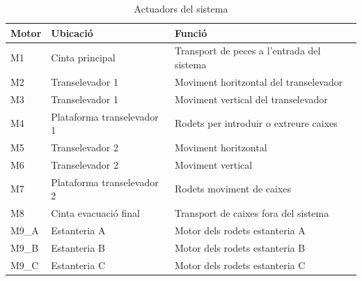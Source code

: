 \documentclass[a4paper,11pt,DIV=13,headings=normal,abstract=true,twoside=semi]{article}
\begin{document}
\begin{table}[H]
\centering
\small

\caption{Actuadors del sistema}
\label{tab:tab_actuadors}
\begin{tabular}{|p{3cm}|p{5cm}|p{6cm}|}

\hline
\textbf{Motor} & \textbf{Ubicació} & \textbf{Funció} \\ \hline

M1 & Cinta principal & Transport de peces a l'entrada del sistema \\ \hline
M2 & Transelevador 1 & Moviment horitzontal del transelevador \\ \hline
M3 & Transelevador 1 & Moviment vertical del transelevador \\ \hline
M4 & Plataforma transelevador 1 & Rodets per introduir o extreure caixes \\ \hline
M5 & Transelevador 2 & Moviment horitzontal \\ \hline
M6 & Transelevador 2 & Moviment vertical \\ \hline
M7 & Plataforma transelevador 2 & Rodets moviment de caixes \\ \hline
M8 & Cinta evacuació final & Transport de caixes fora del sistema \\ \hline
M9\_A & Estanteria A & Motor dels rodets estanteria A\\ \hline
M9\_B & Estanteria B & Motor dels rodets estanteria B\\ \hline
M9\_C & Estanteria C & Motor dels rodets estanteria C\\ \hline

\end{tabular}

\end{table}
\end{document}
